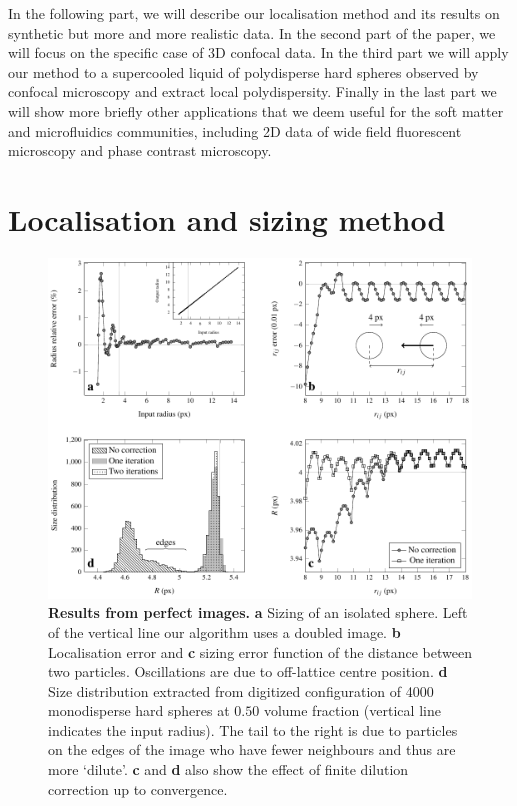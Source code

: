 \documentclass[8.5pt,twoside,twocolumn]{article}
\begin{document}
In the following part, we will describe our localisation method and its results on synthetic but more and more realistic data. In the second part of the paper, we will focus on the specific case of 3D confocal data. In the third part we will apply our method to a supercooled liquid of polydisperse hard spheres observed by confocal microscopy and extract local polydispersity. Finally in the last part we will show more briefly other applications that we deem useful for the soft matter and microfluidics communities, including 2D data of wide field fluorescent microscopy and phase contrast microscopy.

\section*{Localisation and sizing method}

\begin{figure}
\centering
\includegraphics{fig_perfect.pdf}
	\caption{\textbf{Results from perfect images.} \textbf{a} Sizing of an isolated sphere. Left of the vertical line our algorithm uses a doubled image. \textbf{b} Localisation error and \textbf{c} sizing error function of the distance between two particles. Oscillations are due to off-lattice centre position. \textbf{d} Size distribution extracted from digitized configuration of 4000 monodisperse hard spheres at $0.50$ volume fraction (vertical line indicates the input radius). The tail to the right is due to particles on the edges of the image who have fewer neighbours and thus are more `dilute'. \textbf{c} and \textbf{d} also show the effect of finite dilution correction up to convergence.}
	\label{fig:perfect}
\end{figure}
\end{document}
